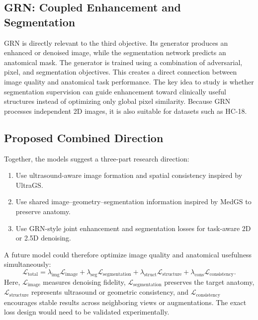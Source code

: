 \documentclass[11pt,a4paper]{article}
\begin{document}
\subsection{GRN: Coupled Enhancement and Segmentation}
GRN is directly relevant to the third objective. Its generator produces an enhanced or denoised image, while the segmentation network predicts an anatomical mask. The generator is trained using a combination of adversarial, pixel, and segmentation objectives. This creates a direct connection between image quality and anatomical task performance. The key idea to study is whether segmentation supervision can guide enhancement toward clinically useful structures instead of optimizing only global pixel similarity. Because GRN processes independent 2D images, it is also suitable for datasets such as HC-18.

\subsection{Proposed Combined Direction}
Together, the models suggest a three-part research direction:
\begin{enumerate}
    \item Use ultrasound-aware image formation and spatial consistency inspired by UltraGS.
    \item Use shared image--geometry--segmentation information inspired by MedGS to preserve anatomy.
    \item Use GRN-style joint enhancement and segmentation losses for task-aware 2D or 2.5D denoising.
\end{enumerate}

A future model could therefore optimize image quality and anatomical usefulness simultaneously:
\begin{equation}
    \mathcal{L}_{\mathrm{total}}
    = \lambda_{\mathrm{img}}\mathcal{L}_{\mathrm{image}}
    + \lambda_{\mathrm{seg}}\mathcal{L}_{\mathrm{segmentation}}
    + \lambda_{\mathrm{struct}}\mathcal{L}_{\mathrm{structure}}
    + \lambda_{\mathrm{cons}}\mathcal{L}_{\mathrm{consistency}}.
\end{equation}
Here, $\mathcal{L}_{\mathrm{image}}$ measures denoising fidelity, $\mathcal{L}_{\mathrm{segmentation}}$ preserves the target anatomy, $\mathcal{L}_{\mathrm{structure}}$ represents ultrasound or geometric consistency, and $\mathcal{L}_{\mathrm{consistency}}$ encourages stable results across neighboring views or augmentations. The exact loss design would need to be validated experimentally.
\end{document}
